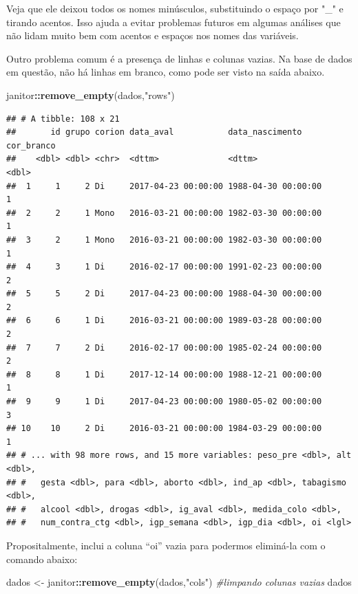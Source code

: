 \documentclass[
]{book}
\newenvironment{Shaded}{\begin{snugshade}}{\end{snugshade}}
\newcommand{\CommentTok}[1]{\textcolor[rgb]{0.56,0.35,0.01}{\textit{#1}}}
\newcommand{\KeywordTok}[1]{\textcolor[rgb]{0.13,0.29,0.53}{\textbf{#1}}}
\newcommand{\NormalTok}[1]{#1}
\newcommand{\OperatorTok}[1]{\textcolor[rgb]{0.81,0.36,0.00}{\textbf{#1}}}
\newcommand{\StringTok}[1]{\textcolor[rgb]{0.31,0.60,0.02}{#1}}
\begin{document}
Veja que ele deixou todos os nomes minúsculos, substituindo o espaço por "\_" e tirando acentos. Isso ajuda a evitar problemas futuros em algumas análises que não lidam muito bem com acentos e espaços nos nomes das variáveis.

Outro problema comum é a presença de linhas e colunas vazias. Na base de dados em questão, não há linhas em branco, como pode ser visto na saída abaixo.

\begin{Shaded}
\begin{Highlighting}[]
\NormalTok{janitor}\OperatorTok{::}\KeywordTok{remove_empty}\NormalTok{(dados,}\StringTok{"rows"}\NormalTok{)}
\end{Highlighting}
\end{Shaded}

\begin{verbatim}
## # A tibble: 108 x 21
##       id grupo corion data_aval           data_nascimento     cor_branco
##    <dbl> <dbl> <chr>  <dttm>              <dttm>                   <dbl>
##  1     1     2 Di     2017-04-23 00:00:00 1988-04-30 00:00:00          1
##  2     2     1 Mono   2016-03-21 00:00:00 1982-03-30 00:00:00          1
##  3     2     1 Mono   2016-03-21 00:00:00 1982-03-30 00:00:00          1
##  4     3     1 Di     2016-02-17 00:00:00 1991-02-23 00:00:00          2
##  5     5     2 Di     2017-04-23 00:00:00 1988-04-30 00:00:00          2
##  6     6     1 Di     2016-03-21 00:00:00 1989-03-28 00:00:00          2
##  7     7     2 Di     2016-02-17 00:00:00 1985-02-24 00:00:00          2
##  8     8     1 Di     2017-12-14 00:00:00 1988-12-21 00:00:00          1
##  9     9     1 Di     2017-04-23 00:00:00 1980-05-02 00:00:00          3
## 10    10     2 Di     2016-03-21 00:00:00 1984-03-29 00:00:00          1
## # ... with 98 more rows, and 15 more variables: peso_pre <dbl>, alt <dbl>,
## #   gesta <dbl>, para <dbl>, aborto <dbl>, ind_ap <dbl>, tabagismo <dbl>,
## #   alcool <dbl>, drogas <dbl>, ig_aval <dbl>, medida_colo <dbl>,
## #   num_contra_ctg <dbl>, igp_semana <dbl>, igp_dia <dbl>, oi <lgl>
\end{verbatim}

Propositalmente, inclui a coluna ``oi'' vazia para podermos eliminá-la com o comando abaixo:

\begin{Shaded}
\begin{Highlighting}[]
\NormalTok{dados <-}\StringTok{ }\NormalTok{janitor}\OperatorTok{::}\KeywordTok{remove_empty}\NormalTok{(dados,}\StringTok{"cols"}\NormalTok{) }\CommentTok{#limpando colunas vazias}
\NormalTok{dados}
\end{Highlighting}
\end{Shaded}
\end{document}
